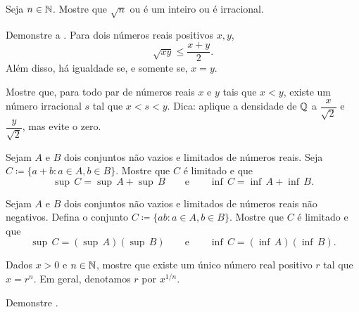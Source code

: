 \begin{exercise}
Seja $n \in {\mathbb{N}}$.
Mostre que $\sqrt{n}$ ou é um inteiro ou é
irracional.
\end{exercise}

\begin{exercise}
Demonstre a \emph{}.
Para dois números reais positivos $x,y$,
\begin{equation*}
\sqrt{xy} \leq \frac{x+y}{2} .
\end{equation*}
Além disso, há igualdade se, e somente se, $x=y$.
\end{exercise}

\begin{exercise}
Mostre que, para todo par de números reais $x$ e $y$ tais que $x < y$, existe
um número irracional $s$ tal que $x < s < y$. Dica:
aplique a densidade de ${\mathbb{Q}}$ a $\dfrac{x}{\sqrt{2}}$ e
$\dfrac{y}{\sqrt{2}}$, mas evite o zero.
\end{exercise}

\begin{exercise} \label{exercise:supofsum}
Sejam $A$ e $B$ dois conjuntos não vazios e limitados de números reais. Seja
$C \coloneqq \{ a+b : a \in A, b \in B \}$.
Mostre que $C$ é limitado e que
\begin{equation*}
\sup\,C = \sup\,A + \sup\,B
\qquad \text{e} \qquad
\inf\,C = \inf\,A + \inf\,B .
\end{equation*}
\end{exercise}

\begin{exercise}
Sejam $A$ e $B$ dois conjuntos não vazios e limitados de números reais não negativos.
Defina o conjunto
$C \coloneqq \{ ab : a \in A, b \in B \}$.
Mostre que $C$ é limitado e que
\begin{equation*}
\sup\,C = (\sup\,A )( \sup\,B)
\qquad \text{e} \qquad
\inf\,C = (\inf\,A )( \inf\,B).
\end{equation*}
\end{exercise}

\begin{exercise}[Difícil] \label{exercise:rootexistshard}
Dados $x > 0$ e $n \in {\mathbb{N}}$, mostre que existe um único número real positivo
$r$ tal que $x = r^n$. Em geral, denotamos $r$ por $x^{1/n}$.
\end{exercise}

\begin{exercise}[Fácil]
Demonstre .
\end{exercise}

